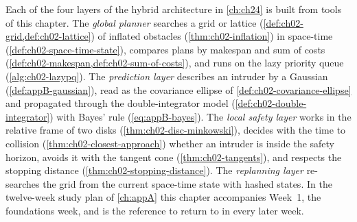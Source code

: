 \begin{dronebox}
Each of the four layers of the hybrid architecture in \cref{ch:ch24} is built from tools of this chapter. The \emph{global planner} searches a grid or lattice (\cref{def:ch02-grid,def:ch02-lattice}) of inflated obstacles (\cref{thm:ch02-inflation}) in space-time (\cref{def:ch02-space-time-state}), compares plans by makespan and sum of costs (\cref{def:ch02-makespan,def:ch02-sum-of-costs}), and runs on the lazy priority queue (\cref{alg:ch02-lazypq}). The \emph{prediction layer} describes an intruder by a Gaussian (\cref{def:appB-gaussian}), read as the covariance ellipse of \cref{def:ch02-covariance-ellipse} and propagated through the double-integrator model (\cref{def:ch02-double-integrator}) with Bayes' rule (\cref{eq:appB-bayes}). The \emph{local safety layer} works in the relative frame of two disks (\cref{thm:ch02-disc-minkowski}), decides with the time to collision (\cref{thm:ch02-closest-approach}) whether an intruder is inside the safety horizon, avoids it with the tangent cone (\cref{thm:ch02-tangents}), and respects the stopping distance (\cref{thm:ch02-stopping-distance}). The \emph{replanning layer} re-searches the grid from the current space-time state with hashed states. In the twelve-week study plan of \cref{ch:appA} this chapter accompanies Week~1, the foundations week, and is the reference to return to in every later week.
\end{dronebox}

